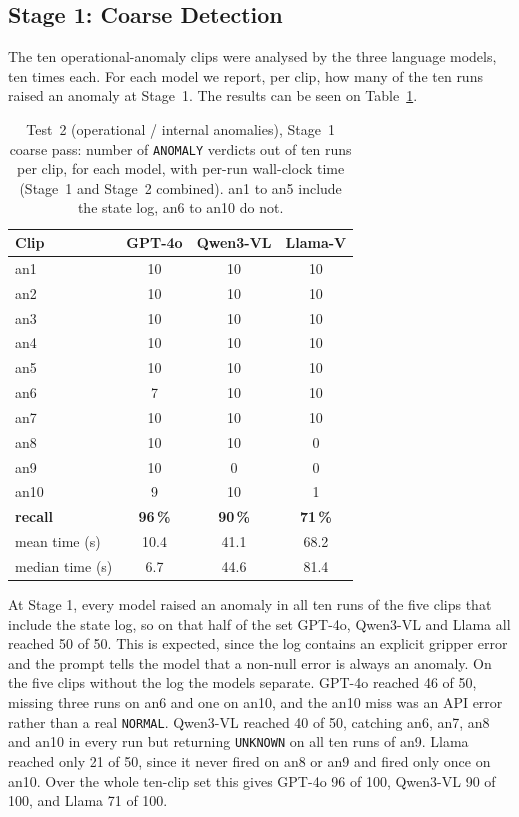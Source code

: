 \documentclass[11pt,a4paper]{article}
\begin{document}
\subsection{Stage 1: Coarse Detection}

The ten operational-anomaly clips were analysed by the three language
models, ten times each. For each model we report, per clip, how many of
the ten runs raised an anomaly at Stage~1. The results can be seen on
Table~\ref{tab:test2-stage1}.

\begin{table}[h]
\centering
\small
\setlength{\tabcolsep}{7pt}
\begin{tabular}{@{}l ccc@{}}
\toprule
Clip & GPT-4o & Qwen3-VL & Llama-V \\
\midrule
an1  & 10 & 10 & 10 \\
an2  & 10 & 10 & 10 \\
an3  & 10 & 10 & 10 \\
an4  & 10 & 10 & 10 \\
an5  & 10 & 10 & 10 \\
an6  & 7  & 10 & 10 \\
an7  & 10 & 10 & 10 \\
an8  & 10 & 10 & 0 \\
an9  & 10 & 0  & 0 \\
an10 & 9  & 10 & 1 \\
\midrule
\textbf{recall} & \textbf{96\,\%} & \textbf{90\,\%} & \textbf{71\,\%} \\
\midrule
mean time (s)   & 10.4 & 41.1 & 68.2 \\
median time (s) & 6.7  & 44.6 & 81.4 \\
\bottomrule
\end{tabular}
\caption{Test~2 (operational / internal anomalies), Stage~1 coarse pass:
number of \texttt{ANOMALY} verdicts out of ten runs per clip, for each
model, with per-run wall-clock time (Stage~1 and Stage~2 combined). an1 to
an5 include the state log, an6 to an10 do not.}
\label{tab:test2-stage1}
\end{table}
\FloatBarrier

At Stage 1, every model raised an anomaly in all ten runs of the five
clips that include the state log, so on that half of the set GPT-4o,
Qwen3-VL and Llama all reached 50 of 50. This is expected, since the log
contains an explicit gripper error and the prompt tells the model that a
non-null error is always an anomaly. On the five clips without the log the
models separate. GPT-4o reached 46 of 50, missing three runs on an6 and
one on an10, and the an10 miss was an API error rather than a real
\texttt{NORMAL}. Qwen3-VL reached 40 of 50, catching an6, an7, an8 and
an10 in every run but returning \texttt{UNKNOWN} on all ten runs of an9.
Llama reached only 21 of 50, since it never fired on an8 or an9 and fired
only once on an10. Over the whole ten-clip set this gives GPT-4o 96 of
100, Qwen3-VL 90 of 100, and Llama 71 of 100.
\end{document}
